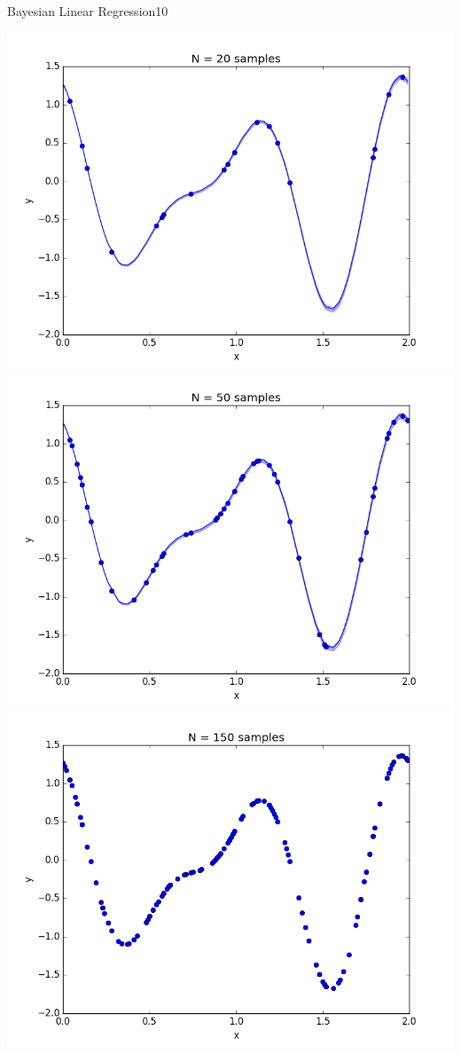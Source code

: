 \begin{questions}
\begin{question}{Bayesian Linear Regression}{10}
\begin{answer}
\centering \includegraphics[width=1.0\linewidth]{img/31d_20} \\
\centering \includegraphics[width=1.0\linewidth]{img/31d_50} \\
\centering \includegraphics[width=1.0\linewidth]{img/31d_150}



\end{answer}
\end{question}
\end{questions}

